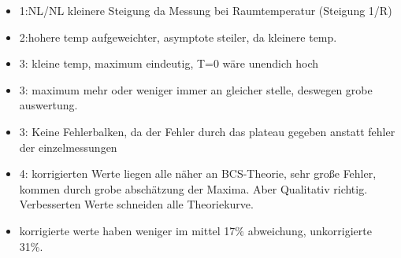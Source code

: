 \documentclass[twoside,        %
               BCOR12mm,       %
               english,ngerman, %
               fleqn,headsepline=false,footsepline=false
              ]{Vorlage/MFPREPORT}
\begin{document}
\begin{itemize}
    \item 1:NL/NL kleinere Steigung da Messung bei Raumtemperatur (Steigung 1/R)
    \item 2:hohere temp aufgeweichter, asymptote steiler, da kleinere temp.
    \item 3: kleine temp, maximum eindeutig, T=0 wäre unendich hoch
    \item 3: maximum mehr oder weniger immer an gleicher stelle, deswegen grobe
        auswertung.
    \item 3: Keine Fehlerbalken, da der Fehler durch das plateau gegeben
        anstatt fehler der einzelmessungen
    \item 4: korrigierten Werte liegen alle näher an BCS-Theorie, sehr große
        Fehler, kommen durch grobe abschätzung der Maxima. Aber Qualitativ
        richtig. Verbesserten Werte schneiden alle Theoriekurve.
    \item korrigierte werte haben weniger im mittel 17\% abweichung,
        unkorrigierte 31\%.
\end{itemize}

\clearpage

%
%
%
%



\end{document}
